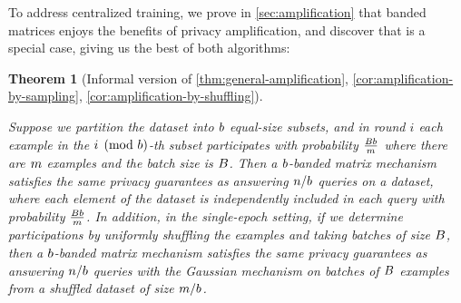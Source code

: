\documentclass{article}
\newtheorem{theorem}{Theorem}
\begin{document}
To address centralized training, we prove in \cref{sec:amplification} that banded matrices enjoys the benefits of privacy amplification, and discover that \dpsgd is a special case, giving us the best of both algorithms:

\begin{theorem}[Informal version of \cref{thm:general-amplification}, \cref{cor:amplification-by-sampling}, \cref{cor:amplification-by-shuffling}]\label{thm:amplification-informal}

Suppose we partition the dataset into $b$ equal-size subsets, and in round $i$ each example in the $i \pmod {b}$-th subset participates with probability $\frac{B b}{m}$ where there are $m$ examples and the batch size is $B$. Then a $b$-banded matrix mechanism satisfies the same privacy guarantees as answering $n / b$ queries on a dataset, where each element of the dataset is independently included in each query with probability $\frac{B b}{m}$.
%
In addition, in the single-epoch setting, if we determine participations by uniformly shuffling the examples and taking batches of size $B$, then a $b$-banded matrix mechanism satisfies the same privacy guarantees as answering $n / b$ queries with the Gaussian mechanism on batches of $B$ examples from a shuffled dataset of size $m / b$. 
\end{theorem}
\end{document}
